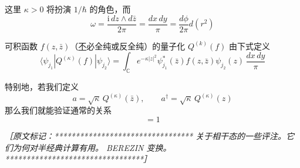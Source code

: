 这里 $\kappa>0$ 将扮演 $1/\hbar$ 的角色，而
\begin{equation}
  \omega=\frac{\mathrm{i}\,dz\wedge d\bar{z}}{2\pi}=\frac{dx\,dy}{\pi}=\frac{d\phi}{2\pi}d(r^2)
  \tag{B.3}
  \label{eq:B.3}
\end{equation}

可积函数 $f(z,\bar{z})$（\underline{不}必全纯或反全纯）的量子化 $Q^{(k)}(f)$ 由下式定义
\begin{equation}
  \langle\psi_{j_1}|Q^{(\kappa)}(f)|\psi_{j_2}\rangle=\int_{\mathbb{C}}e^{-\kappa|z|^2}\psi_{j_1}^{*}(\bar{z})f(z,\bar{z})\psi_{j_2}(z)\,\frac{dx\,dy}{\pi}
  \tag{B.4}
  \label{eq:B.4}
\end{equation}

特别地，若我们定义
\begin{equation}
  a=\sqrt{\kappa}\,Q^{(\kappa)}(\bar{z}),\qquad a^{\dagger}=\sqrt{\kappa}\,Q^{(\kappa)}(z)
  \tag{B.5}
  \label{eq:B.5}
\end{equation}
那么我们就能验证通常的关系
\begin{equation}
  [a,a^{\dagger}]=1
  \tag{B.6}
  \label{eq:B.6}
\end{equation}

{\small\itshape ［原文标记：*********************************\newline
关于相干态的一些评注。它们为何对半经典计算有用。\newline
BEREZIN 变换。\newline
*********************************］}
